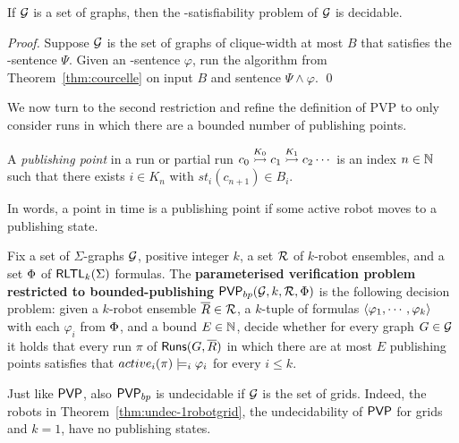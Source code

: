 \begin{corollary} \label{cor:courcelle}
If $\gclass$ is a \courcellian set of graphs, then the \msol-satisfiability problem of $\gclass$ is decidable.
\end{corollary}
\begin{proof}
Suppose $\gclass$ is the set of graphs of clique-width at most $B$ that satisfies the \msol-sentence $\Psi$.
Given an \msol-sentence $\varphi$, run the algorithm from Theorem~\ref{thm:courcelle} on input $B$ and sentence $\Psi \wedge \varphi$. \qed
\end{proof}

We now turn to the second restriction and refine the definition of PVP to only consider runs in which there are a bounded number of publishing points.
\begin{definition}
A \emph{publishing point} in a run or partial run $\onestep{c_0}{c_1}{K_0} \onestep{}{c_2}{K_1} \cdots$ 
is an index $n \in \nat$ such that there exists $i \in K_n$ with 
$st_i(c_{n+1}) \in B_i$.
\end{definition}

In words, a point in time is a publishing point if some active robot moves to a publishing state.

\begin{definition}
Fix a set of $\Sigma$-graphs $\gclass$, positive integer $k$, a set  $\rclass$ of $k$-robot ensembles, and a set $\tclass$ of $\RLTL_k(\Sigma)$ formulas. 
The \textbf{parameterised verification problem restricted to bounded-publishing} $\BPVP(\gclass,k,\rclass,\tclass)$ is the following decision problem:
given a $k$-robot ensemble $\tup{R} \in \rclass$, a $k$-tuple of \RLTL formulas $\tpl{\varphi_1,\cdots,\varphi_k}$ with each $\varphi_i$ from $\tclass$, and a bound $E \in \nat$, decide whether for every graph $G \in \gclass$ it holds that every run $\pi$ of $\runs(G,\tup{R})$ in which there are at most $E$ publishing points satisfies that
$\activeproj_i(\pi) \models_i \varphi_i$ for every $i \leq k$.
\end{definition}

\begin{remark}
Just like $\PVP$, also $\BPVP$ is undecidable if $\gclass$ is the set of grids. Indeed, the robots in Theorem~\ref{thm:undec-1robotgrid}, the undecidability of $\PVP$ for grids and $k = 1$, have no publishing states. 
\end{remark}


%

